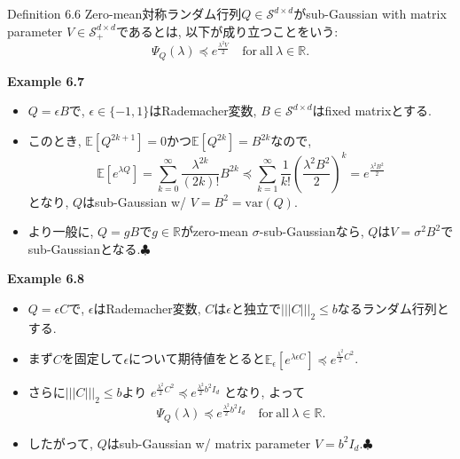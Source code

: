 \documentclass[unicode,aspectratio=169,11pt]{beamer}
\def\endexample{\hfill $\clubsuit$}
\newcommand{\ex}{\mathbb{E}}
\newcommand{\var}{\mathrm{var}}
\newcommand{\bb}{\mathbb}
\newcommand{\cc}{\mathcal}
\begin{document}
\begin{frame}{}{}
  \begin{block}{Definition 6.6}
    Zero-mean対称ランダム行列$Q \in \cc{S}^{d\times d}$がsub-Gaussian with matrix parameter $V \in \cc{S}_{+}^{d \times d}$であるとは,
    以下が成り立つことをいう:
    \[
      \Psi_Q(\lambda) \preceq e^{\frac{\lambda^2 V}{2}}
      \quad \mathrm{for\ all}\ \lambda \in \bb{R}.
      \tag{6.27}
    \]
  \end{block}
  {\bf Example 6.7}
  \begin{itemize}
    \item $Q = \epsilon B$で, $\epsilon \in \{-1, 1\}$はRademacher変数, $B \in \cc{S}^{d \times d}$はfixed matrixとする.
    \item このとき, $\ex[Q^{2k+1}] = 0$かつ$\ex[Q^{2k}] = B^{2k}$なので, 
          \[
            \ex[e^{\lambda Q}]
            = \sum_{k=0}^\infty\frac{\lambda^{2k}}{(2k)!}B^{2k}
            \preceq \sum_{k=1}^\infty \frac{1}{k!} \left(\frac{\lambda^2 B^2}{2}\right)^k
            = e^{\frac{\lambda^2 B^2}{2}}
          \]
          となり, $Q$はsub-Gaussian w/ $V = B^2 = \var(Q)$.
    \item より一般に, $Q = gB$で$g \in \bb{R}$がzero-mean $\sigma$-sub-Gaussianなら, $Q$は$V = \sigma^2 B^2$でsub-Gaussianとなる.\endexample
  \end{itemize}
\end{frame}

\begin{frame}{}{}
  {\bf Example 6.8}
  \begin{itemize}
    \item $Q = \epsilon C$で, $\epsilon$はRademacher変数, $C$は$\epsilon$と独立で$|||C|||_2 \le b$なるランダム行列とする.
    \item まず$C$を固定して$\epsilon$について期待値をとると$\ex_\epsilon[e^{\lambda \epsilon C}] \preceq e^{\frac{\lambda^2}{2}C^2}$.
    \item さらに$||| C |||_2 \le b$より $e^{\frac{\lambda^2}{2}C^2} \preceq e^{\frac{\lambda^2}{2}b^2 I_d}$ となり, よって
          \[ \Psi_Q(\lambda) \preceq e^{\frac{\lambda^2}{2}b^2 I_d} \quad \mathrm{for\ all}\ \lambda \in \bb{R}.\]
    \item したがって, $Q$はsub-Gaussian w/ matrix parameter $V = b^2 I_d$.\endexample
  \end{itemize}
\end{frame}
\end{document}
